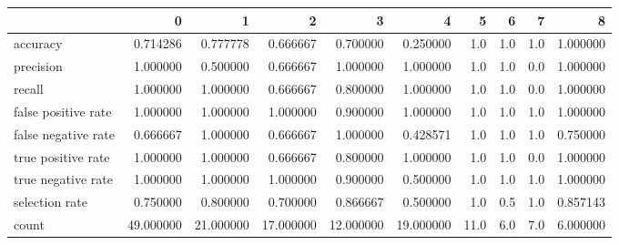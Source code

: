 \begin{tabular}{lrrrrrrrrr}
\toprule
{} &          0 &          1 &          2 &          3 &          4 &     5 &    6 &    7 &         8 \\
\midrule
accuracy            &   0.714286 &   0.777778 &   0.666667 &   0.700000 &   0.250000 &   1.0 &  1.0 &  1.0 &  1.000000 \\
precision           &   1.000000 &   0.500000 &   0.666667 &   1.000000 &   1.000000 &   1.0 &  1.0 &  0.0 &  1.000000 \\
recall              &   1.000000 &   1.000000 &   0.666667 &   0.800000 &   1.000000 &   1.0 &  1.0 &  0.0 &  1.000000 \\
false positive rate &   1.000000 &   1.000000 &   1.000000 &   0.900000 &   1.000000 &   1.0 &  1.0 &  1.0 &  1.000000 \\
false negative rate &   0.666667 &   1.000000 &   0.666667 &   1.000000 &   0.428571 &   1.0 &  1.0 &  1.0 &  0.750000 \\
true positive rate  &   1.000000 &   1.000000 &   0.666667 &   0.800000 &   1.000000 &   1.0 &  1.0 &  0.0 &  1.000000 \\
true negative rate  &   1.000000 &   1.000000 &   1.000000 &   0.900000 &   0.500000 &   1.0 &  1.0 &  1.0 &  1.000000 \\
selection rate      &   0.750000 &   0.800000 &   0.700000 &   0.866667 &   0.500000 &   1.0 &  0.5 &  1.0 &  0.857143 \\
count               &  49.000000 &  21.000000 &  17.000000 &  12.000000 &  19.000000 &  11.0 &  6.0 &  7.0 &  6.000000 \\
\bottomrule
\end{tabular}
